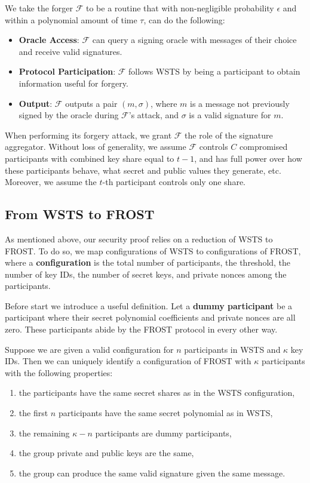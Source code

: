 \documentclass{article}
\begin{document}
We take the forger $\mathcal{F}$ to be a routine that with non-negligible probability $\epsilon$ and within a polynomial amount of time $\tau$, can do the following:
\begin{itemize}
    \item \textbf{Oracle Access}: \( \mathcal{F} \) can query a signing oracle with messages of their choice and receive valid signatures.
    \item \textbf{Protocol Participation}: \( \mathcal{F} \) follows WSTS by being a participant to obtain information useful for forgery.
    \item \textbf{Output}: \( \mathcal{F} \) outputs a pair \((m, \sigma)\), where \(m\) is a message not previously signed by the oracle during \( \mathcal{F} \)'s attack, and \(\sigma\) is a valid signature for \(m\).
\end{itemize}

When performing its forgery attack, we grant $\mathcal{F}$ the role of the signature aggregator. Without loss of generality, we assume $\mathcal{F}$ controls $C$ compromised participants with combined key share equal to $t-1$, and has full power over how these participants behave, what secret and public values they generate, etc. Moreover, we assume the $t$-th participant controls only one share.

\subsection{From WSTS to FROST}

As mentioned above, our security proof relies on a reduction of WSTS to FROST. To do so, we map configurations of WSTS to configurations of FROST, where a \textbf{configuration} is the total number of participants, the threshold, the number of key IDs, the number of secret keys, and private nonces among the participants.

Before start we introduce a useful definition. Let a \textbf{dummy participant} be a participant where their secret polynomial coefficients and private nonces are all zero. These participants abide by the FROST protocol in every other way.

\begin{lem}\label{lemma:wsts-frost-equivalence}
    Suppose we are given a valid configuration for $n$ participants in WSTS and $\kappa$ key IDs. Then we can uniquely identify a configuration of FROST with $\kappa$ participants with the following properties:
    \begin{enumerate}
        \item the participants have the same secret shares as in the WSTS configuration,
        \item the first $n$ participants have the same secret polynomial as in WSTS,
        \item the remaining $\kappa - n$ participants are dummy participants,
        \item the group private and public keys are the same,
        \item the group can produce the same valid signature given the same message.
    \end{enumerate}
\end{lem}
\end{document}
